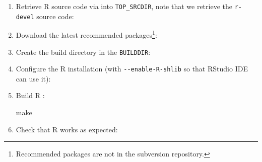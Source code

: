 \documentclass[
  letterpaper,
  DIV=11,
  numbers=noendperiod]{scrreprt}
\newenvironment{Shaded}{\begin{snugshade}}{\end{snugshade}}
\newcommand{\AttributeTok}[1]{\textcolor[rgb]{0.40,0.45,0.13}{#1}}
\newcommand{\BuiltInTok}[1]{\textcolor[rgb]{0.00,0.23,0.31}{#1}}
\newcommand{\FunctionTok}[1]{\textcolor[rgb]{0.28,0.35,0.67}{#1}}
\newcommand{\NormalTok}[1]{\textcolor[rgb]{0.00,0.23,0.31}{#1}}
\newcommand{\OperatorTok}[1]{\textcolor[rgb]{0.37,0.37,0.37}{#1}}
\newcommand{\StringTok}[1]{\textcolor[rgb]{0.13,0.47,0.30}{#1}}
\newcommand{\VariableTok}[1]{\textcolor[rgb]{0.07,0.07,0.07}{#1}}
\begin{document}
\begin{enumerate}
\def\labelenumi{\arabic{enumi}.}
\setcounter{enumi}{-1}
\item
  Retrieve R source code via into \texttt{TOP\_SRCDIR}, note that we
  retrieve the \texttt{r-devel} source code:

\begin{Shaded}
\end{Shaded}
\item
  Download the latest recommended packages\footnote{Recommended packages
    are not in the subversion repository.}:

\begin{Shaded}
\end{Shaded}
\item
  Create the build directory in the \texttt{BUILDDIR}:

\begin{Shaded}
\end{Shaded}
\item
  Configure the R installation (with \texttt{-\/-enable-R-shlib} so that
  RStudio IDE can use it):

\begin{Shaded}
\end{Shaded}
\item
  Build R :

\begin{Shaded}
\begin{Highlighting}[]
\FunctionTok{make}
\end{Highlighting}
\end{Shaded}
\item
  Check that R works as expected:


\end{enumerate}
\end{document}
